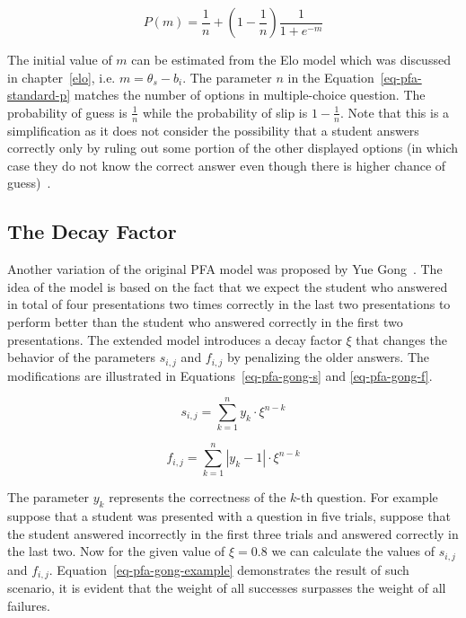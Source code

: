 \begin{equation} \label{eq-pfa-standard-p}
  P(m) = \frac{1}{n} + \left(1 - \frac{1}{n}\right)\frac{1}{1 + e^{-m}}
\end{equation}

The initial value of $m$ can be estimated from the Elo model which was discussed in chapter~\ref{elo}, i.e. $m = \theta_s - b_i$. The parameter $n$ in the Equation~\ref{eq-pfa-standard-p} matches the number of options in multiple-choice question. The probability of guess is $\frac{1}{n}$ while the probability of slip is $1 - \frac{1}{n}$. Note that this is a simplification as it does not consider the possibility that a student answers correctly only by ruling out some portion of the other displayed options (in which case they do not know the correct answer even though there is higher chance of guess)~\cite{Pelanek2015a}. 

\subsection*{The Decay Factor}
\label{pfag}

Another variation of the original PFA model was proposed by Yue Gong~\cite{Gong2011}. The idea of the model is based on the fact that we expect the student who answered in total of four presentations two times correctly in the last two presentations to perform better than the student who answered correctly in the first two presentations. The extended model introduces a decay factor $\xi$ that changes the behavior of the parameters $s_{i,j}$ and $f_{i,j}$ by penalizing the older answers. The modifications are illustrated in Equations~\ref{eq-pfa-gong-s} and \ref{eq-pfa-gong-f}.

\begin{equation} \label{eq-pfa-gong-s}
  s_{i,j} = \sum_{k=1}^{n} y_k \cdot \xi^{n-k}
\end{equation}

\begin{equation} \label{eq-pfa-gong-f}
  f_{i,j} = \sum_{k=1}^{n} |y_k - 1| \cdot \xi^{n-k}
\end{equation}

The parameter $y_k$ represents the correctness of the $k$-th question. For example suppose that a student was presented with a question in five trials, suppose that the student answered incorrectly in the first three trials and answered correctly in the last two. Now for the given value of $\xi = 0.8$ we can calculate the values of $s_{i,j}$ and $f_{i,j}$. Equation~\ref{eq-pfa-gong-example} demonstrates the result of such scenario, it is evident that the weight of all successes surpasses the weight of all failures. 

